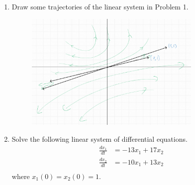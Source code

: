 \documentclass[12pt]{article}
\begin{document}
\begin{enumerate}
\item Draw some trajectories of the linear system in Problem 1. 

\begin{figure}[H]
    \centering
    \includegraphics[width=0.8\textwidth]{Images/P2 Trajectories.png}
\end{figure}

\pagebreak

\item Solve the following linear system of differential equations.
\begin{align*}
\frac{dx_{1}}{dt} &= -13x_{1} + 17x_{2} \\
\frac{dx_{2}}{dt} &= -10x_{1} + 13x_{2} \\
\end{align*}
where $x_{1}(0) = x_{2}(0) = 1$.


\end{enumerate}
\end{document}
